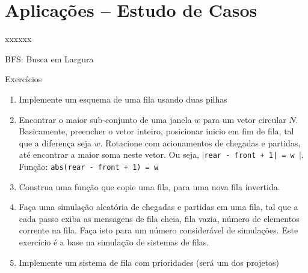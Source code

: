 \section{Aplicações -- Estudo de Casos}

\begin{frame}[c]{xxxxxx} 

		   	\begin{figure}[!htpb]
				\centering
			\end{figure} 
\end{frame}



\begin{frame}[c]{BFS: Busca em Largura} 

		   	\begin{figure}[!htpb]
				\centering
			\end{figure} 
\end{frame}







\begin{frame}{Exercícios}
	
	\begin{enumerate}
	\item Implemente um esquema de uma fila usando duas pilhas
	
	\item Encontrar o maior sub-conjunto de uma janela $w$ para um vetor circular
	$N$. Basicamente, preencher o vetor inteiro, posicionar inicio em fim de fila,
	tal que a diferença seja $w$. Rotacione com acionamentos de 
	chegadas e partidas, até encontrar a maior soma neste vetor. Ou seja,
  \texttt{$\mid $rear - front + 1| = w $\mid $}. 
  Função: \texttt{abs(rear - front + 1) = w}
	 
	 
	\item Construa uma função que copie uma fila, para uma nova fila invertida.
	
	\item Faça uma simulação aleatória de chegadas e partidas em uma fila,
	tal que a cada passo exiba as mensagens de fila cheia, fila vazia,
	número de elementos corrente na fila. Faça isto para um número considerável
	de simulações. Este exercício é a base na simulação de sistemas de filas.
	
	\item Implemente um sistema de fila com prioridades (será um dos projetos)
	
	
	
	
	\end{enumerate}
	
\end{frame}





